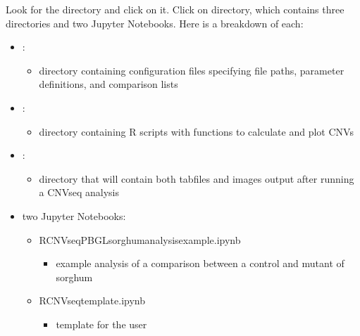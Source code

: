 \documentclass[letterpaper,10pt,english]{sphinxhowto}
\begin{document}
\sphinxAtStartPar
Look for the directory  and click on it. Click on  directory, which contains three directories and two Jupyter Notebooks. Here is a breakdown of each:
\begin{itemize}
\item {} 
\sphinxAtStartPar
{}:
\begin{itemize}
\item {} 
\sphinxAtStartPar
directory containing configuration files specifying file paths, parameter definitions, and comparison lists

\end{itemize}

\item {} 
\sphinxAtStartPar
{}:
\begin{itemize}
\item {} 
\sphinxAtStartPar
directory containing R scripts with functions to calculate and plot CNVs

\end{itemize}

\item {} 
\sphinxAtStartPar
{}:
\begin{itemize}
\item {} 
\sphinxAtStartPar
directory that will contain both tab\sphinxhyphen{}files and images output after running a CNVseq analysis

\end{itemize}

\item {} 
\sphinxAtStartPar
two Jupyter Notebooks:
\begin{itemize}
\item {} 
\sphinxAtStartPar
RCNV\sphinxhyphen{}seq\sphinxhyphen{}PBGL\sphinxhyphen{}sorghum\sphinxhyphen{}analysis\sphinxhyphen{}example.ipynb
\begin{itemize}
\item {} 
\sphinxAtStartPar
example analysis of a comparison between a control and mutant of sorghum

\end{itemize}

\item {} 
\sphinxAtStartPar
RCNV\sphinxhyphen{}seq\sphinxhyphen{}template.ipynb
\begin{itemize}
\item {} 
\sphinxAtStartPar
template for the user

\end{itemize}

\end{itemize}

\end{itemize}
\end{document}
